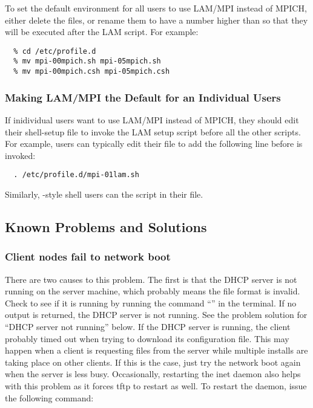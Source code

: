 To set the default environment for all users to use LAM/MPI instead of
MPICH, either delete the  files, or rename them to
have a number higher than  so that they will be executed
after the LAM script.  For example:

\begin{verbatim}
  % cd /etc/profile.d
  % mv mpi-00mpich.sh mpi-05mpich.sh
  % mv mpi-00mpich.csh mpi-05mpich.csh
\end{verbatim}

\subsubsection{Making LAM/MPI the Default for an Individual Users}

If inidividual users want to use LAM/MPI instead of MPICH, they should
edit their shell-setup file to invoke the LAM  setup
script before all the other  scripts.  For
example,  users can typically edit their  file
to add the following line before  is invoked:

\begin{verbatim}
  . /etc/profile.d/mpi-01lam.sh
\end{verbatim}

Similarly, -style shell users can  the
 script in their  file.


\subsection{Known Problems and Solutions}
\label{app:troubleshooting-known-problems}

\subsubsection{Client nodes fail to network boot}
\label{app:troubleshooting-known-problems-dhcp}

There are two causes to this problem. The first is that the DHCP
server is not running on the server machine, which probably means the
 file format is invalid. Check to see if it is
running by running the command ``'' in the
terminal.  If no output is returned, the DHCP server is not running.
See the problem solution for ``DHCP server not running'' below. If the
DHCP server is running, the client probably timed out when trying to
download its configuration file. This may happen when a client is
requesting files from the server while multiple installs are taking
place on other clients. If this is the case, just try the network boot
again when the server is less busy. Occasionally, restarting the inet
daemon also helps with this problem as it forces tftp to restart as
well. To restart the daemon, issue the following command:

